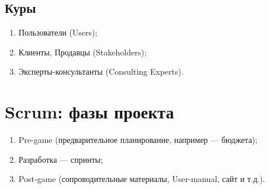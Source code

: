 \documentclass{article}
\let\stdsection\section
\renewcommand\section{\newpage\stdsection}
\begin{document}
    \subsection{Куры}
    \begin{enumerate}
        \item Пользователи (Users);
        \item Клиенты, Продавцы (Stakeholders);
        \item Эксперты-консультанты (Consulting Experts).
    \end{enumerate}

\section{Scrum: фазы проекта}
    \begin{enumerate}
        \item Pre-game (предварительное планирование, например — бюджета);
        \item Разработка — спринты;
        \item Post-game (сопроводительные материалы, User-manual, сайт и т.д.).
    \end{enumerate}
\end{document}
